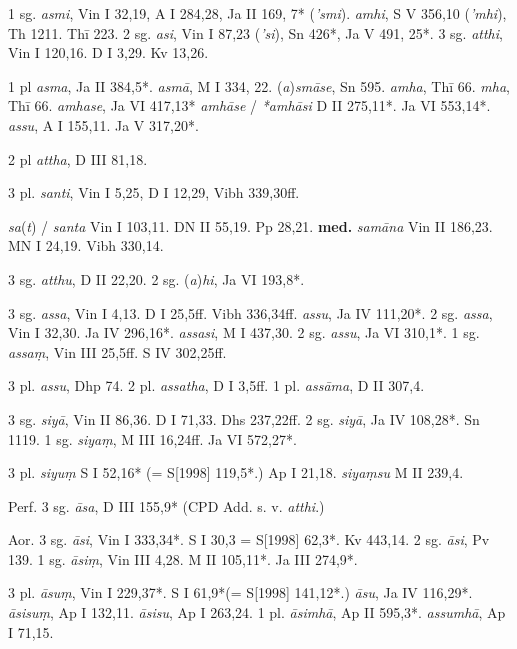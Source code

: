 \documentclass[11pt]{article}
\newcommand*\ṛ{r\symbol{"325}}
\newcommand*\Ṛ{R\symbol{"325}}
\newcommand*\ṝ{r\symbol{"304}\symbol{"325}}
\newcommand*\Ṝ{R\symbol{"304}\symbol{"325}}
\newcommand*\ḷ{l\symbol{"325}}
\newcommand*\ḹ{l\symbol{"304}\symbol{"325}}
\newcommand*\Ḷ{L\symbol{"325}}
\newcommand*\Ḹ{L\symbol{"304}\symbol{"325}}
\begin{document}
\begin{description}[leftmargin=\parindent]
\item[pres.]
1 sg. \textit{asmi},
Vin I 32,19, A I 284,28, Ja II 169, 7* (\textit{'smi}).
\textit{amhi},
S V 356,10 (\textit{'mhi}), Th 1211. Thī 223.
2 sg. \textit{asi},
Vin I 87,23 (\textit{'si}), Sn 426*, Ja V 491, 25*.
3 sg. \textit{atthi},
Vin I 120,16. D I 3,29. Kv 13,26.

1 pl \textit{asma},
Ja II 384,5*.
\textit{asmā},
M I 334, 22.
(\textit{a})\textit{smāse},
Sn 595.
\textit{amha},
Thī 66.
\textit{mha},
Thī 66.
\textit{amhase},
Ja VI 417,13*
\textit{amhāse} / \textit{*amhāsi}
D II 275,11*.
Ja VI 553,14*.
\textit{assu},
A I 155,11.
Ja V 317,20*.

2 pl \textit{attha},
D III 81,18.

3 pl. \textit{santi},
Vin I 5,25, D I 12,29,
Vibh 339,30ff.


\item[part.pres.]
\textit{sa}(\textit{t}) / \textit{santa}
Vin I 103,11. DN II 55,19. Pp 28,21.
\textbf{med.} \textit{samāna}
Vin II 186,23. MN I 24,19. Vibh 330,14.

\item[imper.]
3 sg. \textit{atthu},
D II 22,20.
2 sg. (\textit{a})\textit{hi},
Ja VI 193,8*.

\item[opt. I]
3 sg. \textit{assa},
Vin I 4,13. D I 25,5ff. Vibh 336,34ff.
\textit{assu},
Ja IV 111,20*.
2 sg. \textit{assa},
Vin I 32,30. Ja IV 296,16*.
\textit{assasi},
M I 437,30.
2 sg. \textit{assu},
Ja VI 310,1*.
1 sg. \textit{assaṃ},
Vin III 25,5ff. S IV 302,25ff.

3 pl. \textit{assu},
Dhp 74.
2 pl. \textit{assatha},
D I 3,5ff.
1 pl. \textit{assāma},
D II 307,4.
 
\item[opt. II]
3 sg. \textit{siyā},
Vin II 86,36. D I 71,33. Dhs 237,22ff.
2 sg. \textit{siyā},
Ja IV 108,28*. Sn 1119.
1 sg. \textit{siyaṃ},
M III 16,24ff. Ja VI 572,27*.

3 pl. \textit{siyuṃ}
S I 52,16* (= S[1998] 119,5*.) Ap I 21,18.
\textit{siyaṃsu}
M II 239,4.

\item[pret.]
Perf. 3 sg. \textit{āsa},
D III 155,9* (CPD Add. s. v. \textit{atthi}.)

Aor. 3 sg. \textit{āsi},
Vin I 333,34*.
S I 30,3 = S[1998] 62,3*.
Kv 443,14. 
2 sg. \textit{āsi},
Pv 139.
1 sg. \textit{āsiṃ},
Vin III 4,28.
M II 105,11*.
Ja III 274,9*.

3 pl. \textit{āsuṃ},
Vin I 229,37*.
S I 61,9*(= S[1998] 141,12*.)
\textit{āsu},
Ja IV 116,29*.
\textit{āsisuṃ},
Ap I 132,11.
\textit{āsisu},
Ap I 263,24.
1 pl. \textit{āsimhā},
Ap II 595,3*.
\textit{assumhā},
Ap I 71,15.
\end{description}
\end{document}

